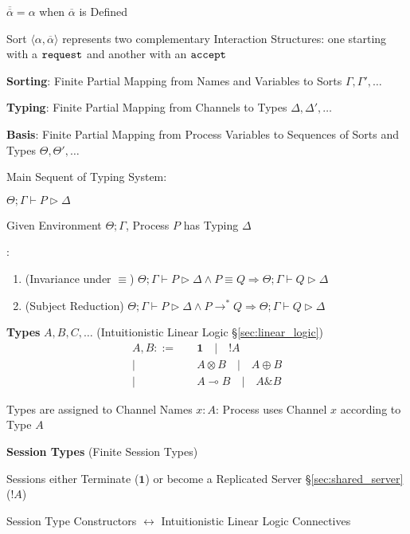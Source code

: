 $\overline{\overline{\alpha}} = \alpha$ when $\overline{\alpha}$ is
  Defined

Sort $\langle \alpha, \overline{\alpha} \rangle$ represents two
complementary Interaction Structures: one starting with a
$\mathtt{request}$ and another with an $\mathtt{accept}$


\textbf{Sorting}: Finite Partial Mapping from Names and Variables to
Sorts $\Gamma, \Gamma', \ldots$

\textbf{Typing}: Finite Partial Mapping from Channels to Types
$\Delta, \Delta', \ldots$

\textbf{Basis}: Finite Partial Mapping from Process Variables to
Sequences of Sorts and Types $\Theta, \Theta', \ldots$



Main Sequent of Typing System:

$\Theta; \Gamma \vdash P \rhd \Delta$

Given Environment $\Theta; \Gamma$, Process $P$ has Typing $\Delta$

\cite{honda-vasconcelos-kubo98}:
\begin{enumerate}
  \item (Invariance under $\equiv$)
    $\Theta; \Gamma \vdash P \rhd \Delta \wedge P \equiv Q
    \Rightarrow \Theta; \Gamma \vdash Q \rhd \Delta$
  \item (Subject Reduction)
    $\Theta; \Gamma \vdash P \rhd \Delta \wedge P \rightarrow^* Q
    \Rightarrow \Theta; \Gamma \vdash Q \rhd \Delta$
\end{enumerate}


\textbf{Types} $A, B, C, \ldots$ (Intuitionistic Linear Logic
\S\ref{sec:linear_logic})
\cite{caires-pfenning10}
\[
\begin{split}
  A,B ::=&\quad \mathbf{1} \quad
        | \quad !A\\
        |&\quad A \otimes B \quad
        | \quad A \oplus B \\
        |&\quad A \multimap B \quad
        | \quad A \& B
\end{split}
\]

Types are assigned to Channel Names $x:A$: Process uses Channel $x$
according to Type $A$


\textbf{Session Types}
(Finite Session Types)
\cite{caires-pfenning10}

Sessions either Terminate ($\mathbf{1}$) or become a Replicated Server
\S\ref{sec:shared_server} ($!A$)

Session Type Constructors $\leftrightarrow$ Intuitionistic Linear
Logic Connectives

